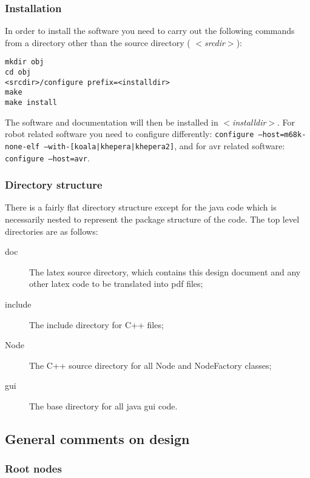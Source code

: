 \documentclass[pdftex,a4paper]{article}
\begin{document}
\subsubsection{Installation}

In order to install the software you need to carry out the following
commands from a directory other than the source directory ({\em
$<$srcdir$>$}):

\begin{verbatim}
mkdir obj
cd obj
<srcdir>/configure prefix=<installdir>
make
make install
\end{verbatim}

The software and documentation will then be installed in {\em
$<$installdir$>$}. For robot related software you need to configure
differently: {\tt configure --host=m68k-none-elf
--with-[koala|khepera|khepera2]}, and for avr related software: {\tt
configure --host=avr}.

\subsubsection{Directory structure}

There is a fairly flat directory structure except for the java code
which is necessarily nested to represent the package structure of the
code. The top level directories are as follows:

\begin{description}

\item[doc] The latex source directory, which contains this design
  document and any other latex code to be translated into pdf files;

\item[include] The include directory for C++ files;

\item[Node] The C++ source directory for all Node and NodeFactory
classes;

\item[gui] The base directory for all java gui code.

\end{description}

\subsection{General comments on design}

\subsubsection{Root nodes}
\label{sec:rootNode}
\end{document}
